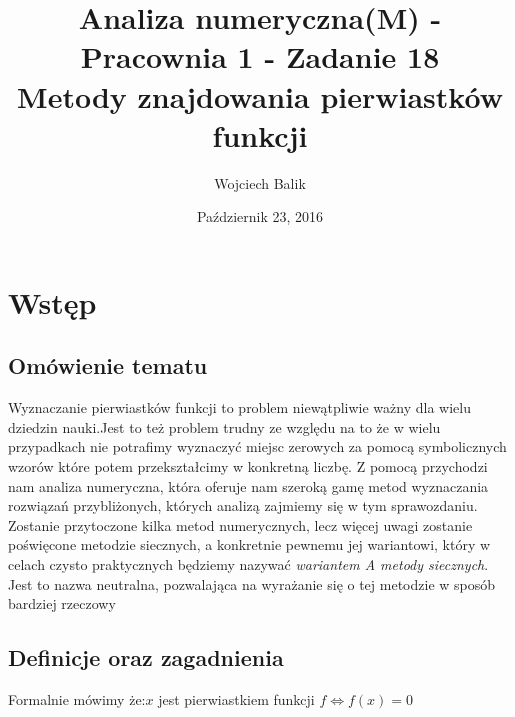 \documentclass[11pt,wide]{article}
\title{Analiza numeryczna(M) - Pracownia 1 - Zadanie 18\\
Metody znajdowania pierwiastków funkcji}
\date{Październik 23, 2016}
\author{Wojciech Balik}
\begin{document}
\maketitle                
\thispagestyle{empty}     
\tableofcontents          
\section{Wstęp} 
\subsection{Omówienie tematu}
Wyznaczanie pierwiastków funkcji to problem niewątpliwie ważny dla wielu dziedzin nauki.Jest to też problem trudny ze względu na to że w wielu przypadkach nie potrafimy wyznaczyć miejsc zerowych za pomocą symbolicznych wzorów które potem przekształcimy w konkretną liczbę.\newline
Z pomocą przychodzi nam analiza numeryczna, która oferuje nam szeroką gamę metod wyznaczania rozwiązań przybliżonych, których analizą zajmiemy się w tym sprawozdaniu. Zostanie przytoczone kilka metod numerycznych, lecz więcej uwagi zostanie poświęcone metodzie siecznych, a konkretnie pewnemu jej wariantowi, który w celach czysto praktycznych będziemy nazywać \textit{wariantem A metody siecznych}. Jest to nazwa neutralna, pozwalająca na wyrażanie się o tej metodzie w sposób bardziej rzeczowy
\subsection{Definicje oraz zagadnienia}
Formalnie mówimy że:\newline$x$ jest pierwiastkiem funkcji $f \Leftrightarrow f(x) = 0 $
\newline
\end{document}
